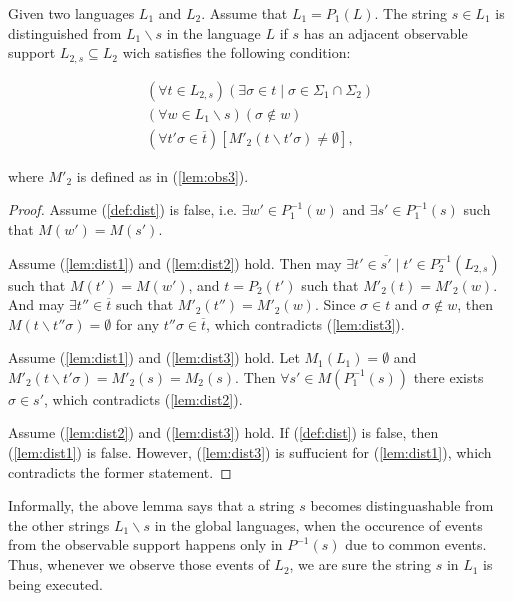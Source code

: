 \documentclass[a4paper, 10pt, conference]{ieeeconf}
\begin{document}
\begin{lemma}
\label{lem:distinguished}
Given two languages $L_1$ and $L_2$. Assume that $L_1 = P_1(L)$. The string $s
\in L_1$ is distinguished from $L_1\backslash s$ in the language $L$ if $s$ has
an adjacent observable support $L_{2,s} \subseteq L_2$ wich satisfies the
following condition:
\end{lemma}
\begin{subequations}
\begin{align}
	(\forall t \in L_{2,s})
	(\exists \sigma \in t \mid \sigma \in \Sigma_1 \cap \Sigma_2)
	\label{lem:dist1}
	\\
	(\forall w \in L_1\backslash s)(\sigma \not \in w)
	\label{lem:dist2}
	\\
	(\forall t'\sigma \in \overline{t})
	[M'_2(t\backslash t'\sigma) \neq \emptyset]
	\label{lem:dist3},
\end{align}
\end{subequations}

where $M'_2$ is defined as in (\ref{lem:obs3}). 

\begin{proof}
Assume (\ref{def:dist}) is false, i.e. $\exists w' \in P_1^{-1}(w)$ and $\exists
s' \in P_1^{-1}(s)$ such that $M(w') = M(s')$. 

Assume (\ref{lem:dist1}) and (\ref{lem:dist2}) hold. Then may $\exists t' \in
\overline{s'} \mid t' \in P_2^{-1}(L_{2,s})$ such that $M(t') = M(w')$, and $t =
P_2(t')$ such that $M'_2(t) = M'_2(w)$. And may $\exists t'' \in \overline{t}$
such that $M'_2(t'') = M'_2(w)$. Since $\sigma \in t$ and $\sigma \not \in w$,
then $M(t \backslash t''\sigma) = \emptyset$ for any $t''\sigma \in
\overline{t}$, which contradicts (\ref{lem:dist3}).

Assume (\ref{lem:dist1}) and (\ref{lem:dist3}) hold. Let $M_1(L_1) = \emptyset$
and $M'_2(t\backslash t'\sigma) = M'_2(s) = M_2(s)$. Then $\forall s' \in
M(P_1^{-1}(s))$ there exists $\sigma \in s'$, which contradicts
(\ref{lem:dist2}).

Assume (\ref{lem:dist2}) and (\ref{lem:dist3}) hold. If (\ref{def:dist}) is
false, then (\ref{lem:dist1}) is false. However, (\ref{lem:dist3}) is suffucient
for (\ref{lem:dist1}), which contradicts the former statement.
\end{proof}

Informally, the above lemma says that a string $s$ becomes distinguashable from
the other strings $L_1\backslash s$ in the global languages, when the occurence
of events from the observable support happens only in $P^{-1}(s)$ due to
common events. Thus, whenever we observe those events of $L_2$,
we are sure the string $s$ in $L_1$ is being executed.
\end{document}
